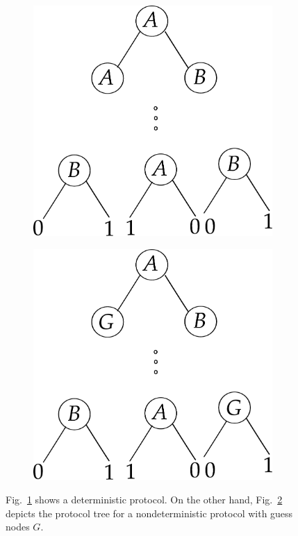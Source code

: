 \documentclass[usletter]{article}
\begin{document}
\begin{figure}
\centering
\begin{subfigure}[b]{0.3 \textwidth}
    \includegraphics[width=\textwidth]{det_protocol.pdf}
    \caption{}
    \label{fig:det_protocol}
\end{subfigure}
\qquad \qquad
\begin{subfigure}[b]{0.3 \textwidth}
    \includegraphics[width=\textwidth]{nondet_protocol.pdf}
    \caption{}
    \label{fig:nondet_protocol}
\end{subfigure}
\caption{Fig.~\ref{fig:det_protocol} shows a deterministic protocol. On the other hand, Fig.~\ref{fig:nondet_protocol} depicts the protocol tree for a nondeterministic protocol with guess nodes $G$.}
\label{fig:nondet_protocol_tree}
\end{figure}
\end{document}
